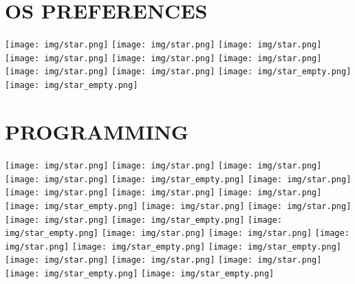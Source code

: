 \documentclass[]{cv-class}
\begin{document}
\begin{aside}
  \section{OS PREFERENCES}
    {\texttt{[image: img/star.png]}
    \texttt{[image: img/star.png]}
    \texttt{[image: img/star.png]}
    \texttt{[image: img/star.png]}
    \texttt{[image: img/star.png]}}
    {\texttt{[image: img/star.png]}
    \texttt{[image: img/star.png]}
    \texttt{[image: img/star.png]}
    \texttt{[image: img/star\_empty.png]}
    \texttt{[image: img/star\_empty.png]}}
    ~
  \section{PROGRAMMING}
    {\texttt{[image: img/star.png]}
    \texttt{[image: img/star.png]}
    \texttt{[image: img/star.png]}
    \texttt{[image: img/star.png]}
    \texttt{[image: img/star\_empty.png]}}
    {\texttt{[image: img/star.png]}
    \texttt{[image: img/star.png]}
    \texttt{[image: img/star.png]}
    \texttt{[image: img/star.png]}
    \texttt{[image: img/star\_empty.png]}}
    {\texttt{[image: img/star.png]}
    \texttt{[image: img/star.png]}
    \texttt{[image: img/star.png]}
    \texttt{[image: img/star\_empty.png]}
    \texttt{[image: img/star\_empty.png]}}
    {\texttt{[image: img/star.png]}
    \texttt{[image: img/star.png]}
    \texttt{[image: img/star.png]}
    \texttt{[image: img/star\_empty.png]}
    \texttt{[image: img/star\_empty.png]}}
    {\texttt{[image: img/star.png]}
    \texttt{[image: img/star.png]}
    \texttt{[image: img/star.png]}
    \texttt{[image: img/star\_empty.png]}
    \texttt{[image: img/star\_empty.png]}}
    ~

\end{aside}
\end{document}
